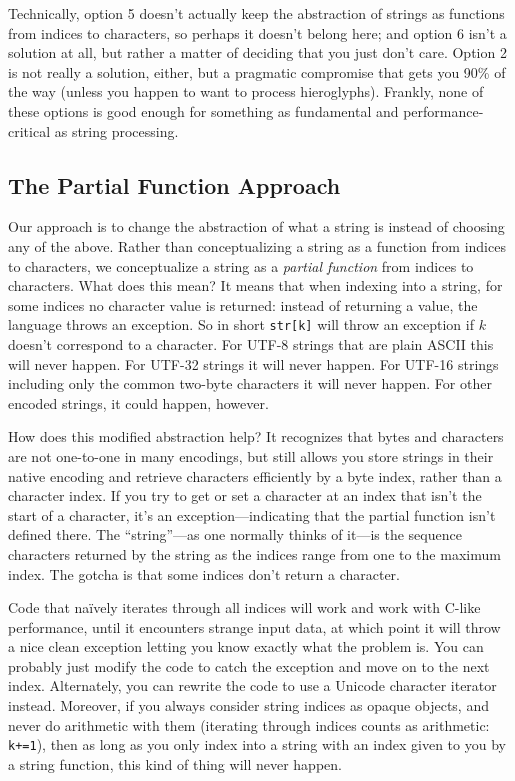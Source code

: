 \documentclass{article}
\renewcommand{\sec}[1]{\label{sec:#1}}
\begin{document}
Technically, option 5 doesn't actually keep the abstraction of strings as functions from indices to characters, so perhaps it doesn't belong here;
and option 6 isn't a solution at all, but rather a matter of deciding that you just don't care.
Option 2 is not really a solution, either, but a pragmatic compromise that gets you 90\% of the way (unless you happen to want to process hieroglyphs).
Frankly, none of these options is good enough for something as fundamental and performance-critical as string processing.

\subsection{The Partial Function Approach}
\sec{partial-function-strings}

Our approach is to change the abstraction of what a string is instead of choosing any of the above.
Rather than conceptualizing a string as a function from indices to characters, we conceptualize a string as a \emph{partial function} from indices to characters.
What does this mean?
It means that when indexing into a string, for some indices no character value is returned:
instead of returning a value, the language throws an exception.
So in short \verb|str[k]| will throw an exception if $k$ doesn't correspond to a character.
For UTF-8 strings that are plain ASCII this will never happen.
For UTF-32 strings it will never happen.
For UTF-16 strings including only the common two-byte characters it will never happen.
For other encoded strings, it could happen, however.

How does this modified abstraction help?
It recognizes that bytes and characters are not one-to-one in many encodings, but still allows you store strings in their native encoding and retrieve characters efficiently by a byte index, rather than a character index.
If you try to get or set a character at an index that isn't the start of a character, it's an exception---indicating that the partial function isn't defined there.
The ``string''---as one normally thinks of it---is the sequence characters returned by the string as the indices range from one to the maximum index.
The gotcha is that some indices don't return a character.

Code that na\"ively iterates through all indices will work and work with C-like performance, until it encounters strange input data, at which point it will throw a nice clean exception letting you know exactly what the problem is.
You can probably just modify the code to catch the exception and move on to the next index.
Alternately, you can rewrite the code to use a Unicode character iterator instead.
Moreover, if you always consider string indices as opaque objects, and never do arithmetic with them (iterating through indices counts as arithmetic: \verb|k+=1|), then as long as you only index into a string with an index given to you by a string function, this kind of thing will never happen.
\end{document}
